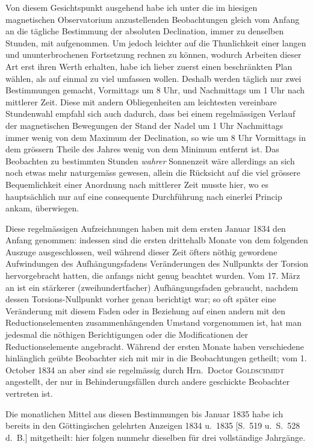 Von diesem Gesichtspunkt ausgehend habe ich unter die im hiesigen magnetischen Observatorium anzustellenden Beobachtungen gleich vom Anfang an die tägliche Bestimmung der absoluten Declination, immer zu denselben Stunden, mit aufgenommen. Um jedoch leichter auf die Thunlichkeit einer langen und ununterbrochenen Fortsetzung rechnen zu können, wodurch Arbeiten dieser Art erst ihren Werth erhalten, habe ich lieber zuerst einen beschränkten Plan wählen, als auf einmal zu viel umfassen wollen. Deshalb werden täglich nur zwei Bestimmungen gemacht, Vormittags um 8 Uhr, und Nachmittags um 1 Uhr nach mittlerer Zeit. Diese mit andern Obliegenheiten am leichtesten vereinbare Stundenwahl empfahl sich auch dadurch, dass bei einem regelmässigen Verlauf der magnetischen Bewegungen der Stand der Nadel um 1 Uhr Nachmittags immer wenig von dem Maximum der Declination, so wie um 8 Uhr Vormittags in dem grössern Theile des Jahres wenig von dem Minimum entfernt ist. Das Beobachten zu bestimmten Stunden \textit{wahrer} Sonnenzeit wäre allerdings an sich noch etwas mehr naturgemäss gewesen, allein die Rücksicht auf die viel grössere Bequemlichkeit einer Anordnung nach mittlerer Zeit musste hier, wo es hauptsächlich nur auf eine consequente Durchführung nach einerlei Princip ankam, überwiegen.

Diese regelmässigen Aufzeichnungen haben mit dem ersten Januar 1834 den Anfang genommen: indessen sind die ersten drittehalb Monate von dem folgenden Auszuge ausgeschlossen, weil während dieser Zeit öfters nöthig gewordene Aufwindungen des Aufhängungsfadens Veränderungen des Nullpunkts der Torsion hervorgebracht hatten, die anfangs nicht genug beachtet wurden. Vom 17. März an ist ein stärkerer (zweihundertfacher) Aufhängungsfaden gebraucht, nachdem dessen Torsions-Nullpunkt vorher genau berichtigt war; so oft später eine Veränderung mit diesem Faden oder in Beziehung auf einen andern mit den Reductionselementen zusammenhängenden Umstand vorgenommen ist, hat man jedesmal die nöthigen Berichtigungen oder die Modificationen der Reductionselemente angebracht. Während der ersten Monate haben verschiedene hinlänglich geübte Beobachter sich mit mir in die Beobachtungen getheilt; vom 1. October 1834 an aber sind sie regelmässig durch Hrn.\ Doctor \textsc{Goldschmidt} angestellt, der nur in Behinderungsfällen durch andere geschickte Beobachter vertreten ist.

Die monatlichen Mittel aus diesen Bestimmungen bis Januar 1835 habe ich bereits in den Göttingischen gelehrten Anzeigen 1834 u.\ 1835 [S.\ 519 u.\ S.\ 528 d.\ B.] mitgetheilt: hier folgen nunmehr dieselben für drei vollständige Jahrgänge.

